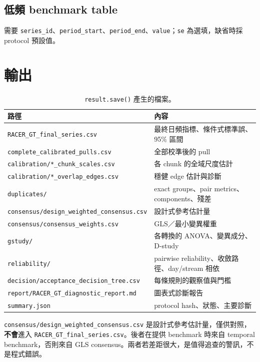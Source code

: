 \documentclass[12pt,a4paper,oneside]{article}
\begin{document}
\subsection{低頻 benchmark table}

需要 \texttt{series\_id}、\texttt{period\_start}、\texttt{period\_end}、\texttt{value}；\texttt{se} 為選填，缺省時採 protocol 預設值。

\section{輸出}

\begin{table}[H]
\centering\small
\caption{\texttt{result.save()} 產生的檔案。}
\begin{tabularx}{\textwidth}{lX}
\toprule
路徑 & 內容\\
\midrule
\texttt{RACER\_GT\_final\_series.csv} & 最終日頻指標、條件式標準誤、95\% 區間\\
\texttt{complete\_calibrated\_pulls.csv} & 全部校準後的 pull\\
\texttt{calibration/*\_chunk\_scales.csv} & 各 chunk 的全域尺度估計\\
\texttt{calibration/*\_overlap\_edges.csv} & 穩健 edge 估計與診斷\\
\texttt{duplicates/} & exact groups、pair metrics、components、殘差\\
\texttt{consensus/design\_weighted\_consensus.csv} & 設計式參考估計量\\
\texttt{consensus/consensus\_weights.csv} & GLS／最小變異權重\\
\texttt{gstudy/} & 各轉換的 ANOVA、變異成分、D-study\\
\texttt{reliability/} & pairwise reliability、收斂路徑、day/stream 相依\\
\texttt{decision/acceptance\_decision\_tree.csv} & 每條規則的觀察值與門檻\\
\texttt{report/RACER\_GT\_diagnostic\_report.md} & 圖表式診斷報告\\
\texttt{summary.json} & protocol hash、狀態、主要診斷\\
\bottomrule
\end{tabularx}
\end{table}

\begin{remark}
\texttt{consensus/design\_weighted\_consensus.csv} 是設計式參考估計量，僅供對照，\textbf{不會}進入 \texttt{RACER\_GT\_final\_series.csv}。後者在提供 benchmark 時來自 temporal benchmark，否則來自 GLS consensus。兩者若差距很大，是值得追查的警訊，不是程式錯誤。
\end{remark}
\end{document}
